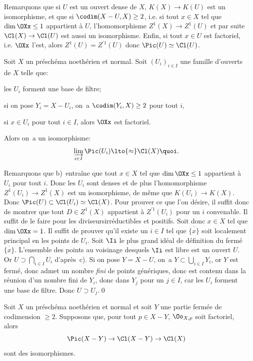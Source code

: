 Remarquons que si $U$ est un ouvert dense de $X$, $K(X)\to K(U)$ est un isomorphisme, et que si $\codim(X-U, X)\geq 2$, i.e. si tout $x\in X$ tel que $\dim\OXx\leq 1$ appartient \`a $U$, l'homomorphisme $Z^1(X)\to Z^1(U)$ et par suite $\Cl(X)\to\Cl(U)$ est aussi un isomorphisme. Enfin, si tout $x\in U$ est factoriel, i.e. $\OXx$ l'est, alors $Z^1(U) = Z^{\prime1}(U)$ donc $\Pic(U)\simeq\Cl(U)$.

\begin{propositionblah} \label{XI.3.7.1}
Soit $X$ un pr\'esch\'ema noeth\'erien et normal. Soit $(U_i)_{i\in I}$ une famille d'ouverts de $X$ telle que:
\begin{enumeratea}
\item
les $U_i$ forment une base de filtre;
\item
si on pose $Y_i=X-U_i$, on~a $\codim(Y_i, X)\geq 2$ pour tout $i$,
\item
si $x\in U_i$ pour tout $i\in I$, alors $\OXx$ est factoriel.
\end{enumeratea}
\noindent
Alors on~a un isomorphisme:
\[
\varinjlim_{i\in I}\Pic(U_i)\lto{\approx}\Cl(X){\quoi}.
\]
\end{propositionblah} Remarquons que b)~entra\^ine que tout $x\in X$ tel que $\dim\OXx\leq 1$ appartient \`a $U_i$ pour tout $i$. Donc les $U_i$ sont denses et de plus l'homomorphisme $Z^1(U_i)\to Z^1(X)$ est un isomorphisme, de m\^eme que $K(U_i)\to K(X)$. Donc $\Pic(U)\subset \Cl(U_i) \simeq \Cl(X)$. Pour prouver ce que l'on d\'esire, il suffit donc de montrer que tout $D\in Z^1(X)$ appartient \`a $Z^{\prime1}(U_i)$ pour un $i$ convenable. Il suffit de le faire pour les \og diviseurs\fg irr\'eductibles et positifs. Soit donc $x\in X$ tel que $\dim\OXx=1$. Il suffit de prouver qu'il existe un $i\in I$ tel que $\overline{\{x\}}$ soit localement principal en les points de $U_i$. Soit $\Ii$ le plus grand id\'eal de d\'efinition du ferm\'e $\overline{\{x\}}$. L'ensemble des points au voisinage desquels $\Ii$ est libre est un ouvert $U$. Or $U\supset \bigcap_{i\in I}U_i$ d'apr\`es~c). Si on pose $Y=X-U$, on~a $Y\subset \bigcup_{i\in I}Y_i$, or $Y$ est ferm\'e, donc admet un nombre \emph{fini} de points g\'en\'eriques, donc est contenu dans la r\'eunion d'un nombre fini de $Y_i$, donc dans $Y_j$ pour un $j\in I$, car les $U_i$ forment une base de filtre. Donc $U\supset U_j$.\qed

\begin{corollaire} \label{XI.3.8}
Soit $X$ un pr\'esch\'ema noeth\'erien et normal et soit $Y$ une partie ferm\'ee de codimension $\geq 2$. Supposons que, pour tout $p\in X-Y$, $\Oo_{X, p}$ soit factoriel, alors
\[
\Pic(X-Y)\to\Cl(X-Y)\to\Cl(X)
\]
sont des isomorphismes.
\end{corollaire}

